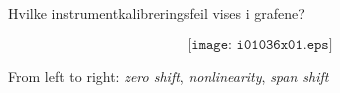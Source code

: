 


Hvilke instrumentkalibreringsfeil vises i grafene?

$$\texttt{[image: i01036x01.eps]}$$







 






From left to right: {\it zero shift}, {\it nonlinearity}, {\it span shift}




